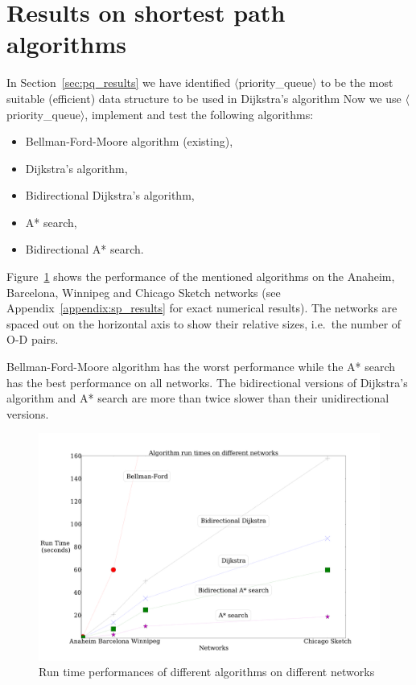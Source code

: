 \section{Results on shortest path algorithms} \label{sec:allresults}
In Section~\ref{sec:pq_results} we have identified  $\langle$priority\_queue$\rangle$ to be the most suitable (efficient) data structure to be used in Dijkstra's algorithm
Now we use $\langle$priority\_queue$\rangle$, implement and test the following algorithms:
\begin{itemize}
        \item Bellman-Ford-Moore algorithm (existing),
        \item Dijkstra's algorithm,
        \item Bidirectional Dijkstra's algorithm,
        \item A* search,
        \item Bidirectional A* search.
\end{itemize}
Figure~\ref{fig:allresults} shows the performance of the mentioned algorithms on the Anaheim, Barcelona, Winnipeg and Chicago Sketch networks
(see Appendix~\ref{appendix:sp_results} for exact numerical results).
The networks are spaced out on the horizontal axis to show their relative sizes, i.e.\ the number of O-D pairs.

Bellman-Ford-Moore algorithm has the worst performance while the A* search has the best performance on all networks.
The bidirectional versions of Dijkstra's algorithm and A* search are more than twice slower than their unidirectional versions.

\begin{figure}[H]
    \centering
    \includegraphics[width=\textwidth]{img/runtime}
    \caption{Run time performances of different algorithms on different networks}
    \label{fig:allresults}
\end{figure}

